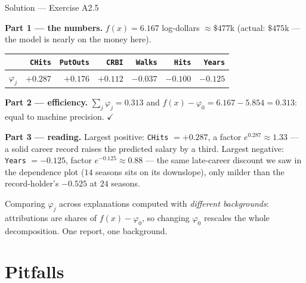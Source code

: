 \documentclass[aspectratio=169,11pt]{beamer}
\begin{document}
\begin{frame}{Solution --- Exercise A2.5}
\begin{solutionbox}
  \scriptsize
  \textbf{Part 1 --- the numbers.} $f(x) = 6.167$ log-dollars $\approx \$477$k
  (actual: $\$475$k --- the model is nearly on the money here).
  \begin{center}
  \begin{tabular}{@{}lrrrrrr@{}}
    \toprule
    & \texttt{CHits} & \texttt{PutOuts} & \texttt{CRBI} & \texttt{Walks} & \texttt{Hits} & \texttt{Years} \\
    \midrule
    $\varphi_j$ & $+0.287$ & $+0.176$ & $+0.112$ & $-0.037$ & $-0.100$ & $-0.125$ \\
    \bottomrule
  \end{tabular}
  \end{center}
  \textbf{Part 2 --- efficiency.} $\sum_j\varphi_j = 0.313$ and
  $f(x)-\varphi_0 = 6.167-5.854 = 0.313$: equal to machine precision. $\checkmark$

  \smallskip
  \textbf{Part 3 --- reading.} Largest positive: \texttt{CHits} $=+0.287$, a factor
  $e^{0.287}\approx 1.33$ --- a solid career record raises the predicted salary by a
  third. Largest negative: \texttt{Years} $=-0.125$, factor $e^{-0.125}\approx0.88$
  --- the same late-career discount we saw in the dependence plot ($14$ seasons sits
  on its downslope), only milder than the record-holder's $-0.525$ at $24$ seasons.
\end{solutionbox}
\begin{mistake}
  Comparing $\varphi_j$ across explanations computed with \emph{different
  backgrounds}: attributions are shares of $f(x)-\varphi_0$, so changing $\varphi_0$
  rescales the whole decomposition. One report, one background.
\end{mistake}
\end{frame}

\section{Pitfalls}
\end{document}
